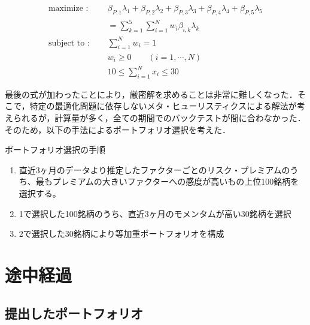 \documentclass[11pt]{jreport}
\begin{document}
\begin{equation}
\begin{split}
\text{maximize : }\quad & \beta_{P,1}\lambda_1 + \beta_{P,2}\lambda_2 + \beta_{P,3}\lambda_3 + \beta_{P,4}\lambda_4 + \beta_{P,5}\lambda_5\\
& = \sum_{k=1}^5 \sum_{i=1}^N w_i \beta_{i,k} \lambda_k\\
\text{subject to : }\quad & \sum_{i=1}^N w_i = 1\\
& w_i \geq 0\qquad(i=1,\cdots,N)\\
&10 \leq \sum_{i=1}^Nx_i \leq 30
\end{split}
\label{eq:port_optim}
\end{equation}

最後の式が加わったことにより，厳密解を求めることは非常に難しくなった．そこで，特定の最適化問題に依存しないメタ・ヒューリスティクスによる解法が考えられるが，計算量が多く，全ての期間でのバックテストが間に合わなかった．そのため，以下の手法によるポートフォリオ選択を考えた．

\begin{itembox}[l]{ポートフォリオ選択の手順}
\begin{enumerate}
\item 直近3ヶ月のデータより推定したファクターごとのリスク・プレミアムのうち、最もプレミアムの大きいファクターへの感度が高いもの上位100銘柄を選択する。
\item 1で選択した100銘柄のうち、直近3ヶ月のモメンタムが高い30銘柄を選択
\item 2で選択した30銘柄により等加重ポートフォリオを構成
\end{enumerate}
\end{itembox}

\chapter{途中経過}
\section{提出したポートフォリオ}
\end{document}
